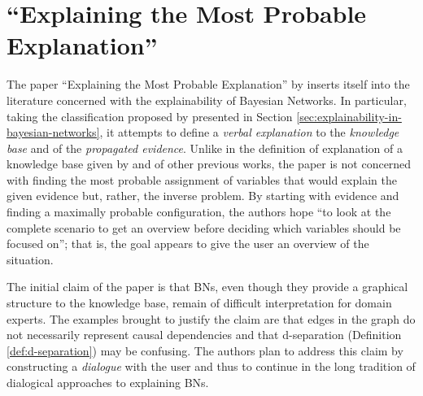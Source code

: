 
\section{\enquote{Explaining the Most Probable Explanation}} \label{sec:explaining-the-most-probable-explanation}
The paper \enquote{Explaining the Most Probable Explanation} by \citet{Butz2018} inserts itself into the literature concerned with the explainability of Bayesian Networks.
In particular, taking the classification proposed by \citet{lacave2002review} presented in Section \ref{sec:explainability-in-bayesian-networks}, it attempts to define a \textit{verbal explanation} to the \textit{knowledge base} and of the \textit{propagated evidence}.
Unlike in the definition of explanation of a knowledge base given by \citet{lacave2002review} and of other previous works, the paper is not concerned with finding the most probable assignment of variables that would explain the given evidence but, rather, the inverse problem.
By starting with evidence and finding a maximally probable configuration, the authors hope \enquote{to look at the complete scenario to get an overview before deciding which variables should be focused on}; that is, the goal appears to give the user an overview of the situation.  

The initial claim of the paper is that BNs, even though they provide a graphical structure to the knowledge base, remain of difficult interpretation for domain experts.
The examples brought to justify the claim are that edges in the graph do not necessarily represent causal dependencies and that d-separation (Definition \ref{def:d-separation}) may be confusing.
The authors plan to address this claim by constructing a \textit{dialogue} with the user and thus to continue in the long tradition of dialogical approaches to explaining BNs.

